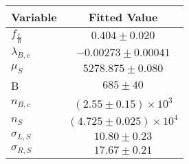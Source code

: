 \begin{tabular}[t]{lc}
\hline
Variable &Fitted Value\\
\hline\hline
$f_{\frac{L}{R}}$&$0.404\pm0.020$\\
\hline
$\lambda_{B,c}$&$-0.00273\pm0.00041$\\
\hline
$\mu_S$&$5278.875\pm0.080$\\
\hline
B&$685\pm40$\\
\hline
$n_{B,c}$&$(2.55\pm0.15)\times 10^3$\\
\hline
$n_S$&$(4.725\pm0.025)\times 10^4$\\
\hline
$\sigma_{L, S}$&$10.80\pm0.23$\\
\hline
$\sigma_{R, S}$&$17.67\pm0.21$\\
\hline
\end{tabular}